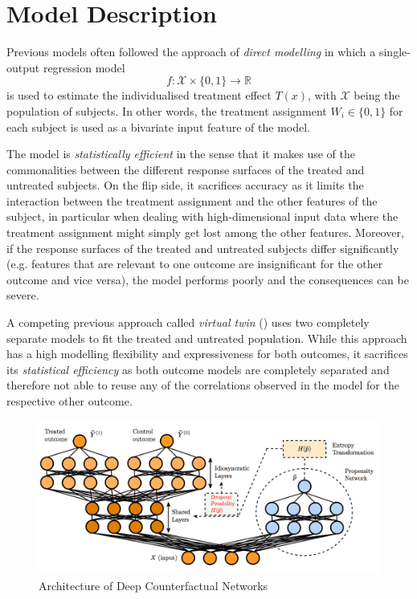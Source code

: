 \section{Model Description}
Previous models often followed the approach of \emph{direct modelling} in which a single-output regression model 
\begin{equation}
f: \mathcal{X} \times \{0,1\} \rightarrow \mathbb{R}
\end{equation}
is used to estimate the individualised treatment effect $T(x)$, with $\mathcal{X}$ being the population of subjects. In other words, the treatment assignment $W_i \in \{0,1\}$ for each subject is used as a bivariate input feature of the model. 

The model is \emph{statistically efficient} in the sense that it makes use of the commonalities between the different response surfaces of the treated and untreated subjects. On the flip side, it sacrifices accuracy as it limits the interaction between the treatment assignment and the other features of the subject, in particular when dealing with  high-dimensional input data where the treatment assignment might simply get lost among the other features. Moreover, if the response surfaces of the treated and untreated subjects differ significantly (e.g. features that are relevant to one outcome are insignificant for the other outcome and vice versa), the model performs poorly and the consequences can be severe. 

A competing previous approach called \emph{virtual twin} (\cite{virtual-twin}) uses two completely separate models to fit the treated and untreated population. While this approach has a high modelling flexibility and expressiveness for both outcomes, it sacrifices its \emph{statistical efficiency} as both outcome models are completely separated and therefore not able to reuse any of the correlations observed in the model for the respective other outcome. 




\begin{figure}[h]
	\centering
	\includegraphics[width=1.0\textwidth]{figures/chapter-3/pbd-architecture.png}
	\caption{Architecture of Deep Counterfactual Networks}\label{fig:dcn-architecture}
\end{figure}

